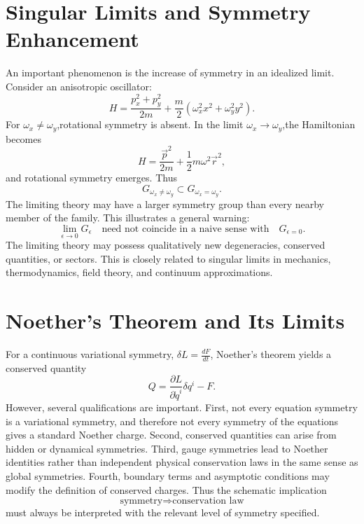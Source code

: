 \section{Singular Limits and Symmetry Enhancement}
An important phenomenon is the  increase  of symmetry in an idealized limit.
Consider an anisotropic oscillator:
\[H=\frac{p_x^2+p_y^2}{2m}+\frac{m}{2}(\omega_x^2x^2+\omega_y^2y^2).\]
For $\omega_x\neq\omega_y$,rotational symmetry is absent.
In the limit $\omega_x\rightarrow\omega_y$,the Hamiltonian becomes
\[H=\frac{\vec{p}^2}{2m}+\frac12m\omega^2\vec{r}^2,\]
and rotational symmetry emerges.
Thus
\[
G_{\omega_x\neq\omega_y}\subset G_{\omega_x=\omega_y}.\]
The limiting theory may have a larger symmetry group than every nearby member of the family.
This illustrates a general warning:
\[\boxed{\lim_{\epsilon\to0}G_\epsilon\quad\text{need not coincide in a 
naive sense with}\quad G_{\epsilon=0}.}\]
The limiting theory may possess qualitatively new degeneracies, conserved quantities, or sectors.
This is closely related to singular limits in mechanics, thermodynamics, field theory, and continuum approximations.

\section{Noether's Theorem and Its Limits}
For a continuous variational symmetry, $\delta L=\tfrac{dF}{dt}$,
Noether's theorem yields a conserved quantity
\[Q=\frac{\partial L}{\partial\dot q^i}\delta q^i-F.\]
However, several qualifications are important.
First, not every equation symmetry is a variational symmetry, and therefore not
every symmetry of the equations gives a standard Noether charge.
Second, conserved quantities can arise from hidden or dynamical symmetries.
Third, gauge symmetries lead to Noether identities rather than independent
physical conservation laws in the same sense as global symmetries.
Fourth, boundary terms and asymptotic conditions may modify the definition of
conserved charges.
Thus the schematic implication
\[\text{symmetry}\Longrightarrow\text{conservation law}\]
must always be interpreted with the relevant level of symmetry specified.

